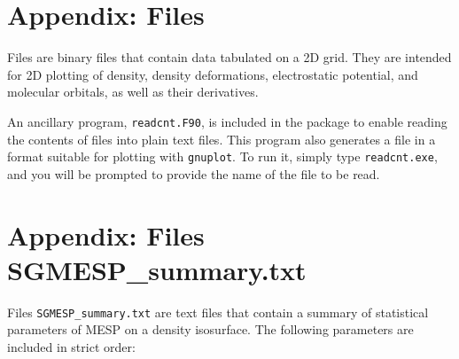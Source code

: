 \documentclass[10pt]{article}
\begin{document}
\section{Appendix: Files \cnt\label{A4}}

Files \cnt{} are binary files that contain data
tabulated on a 2D grid. They are intended for 2D plotting of density, density
deformations, electrostatic potential, and molecular orbitals, as well as their
derivatives. 

An ancillary program, \texttt{readcnt.F90}, is included in the
package to enable reading the contents of \cnt{ } files into plain text files.
This program also generates a file in a format suitable for plotting with
\texttt{gnuplot}. To run it, simply type \texttt{readcnt.exe}, and you
will be prompted to provide the name of the \cnt{ } file to be read.


\section{Appendix: Files SGMESP\_summary.txt\label{A5}}

Files \texttt{SGMESP\_summary.txt} are text files that contain a summary of statistical 
parameters of MESP on a density isosurface. The following parameters are included
in strict order:
\end{document}

